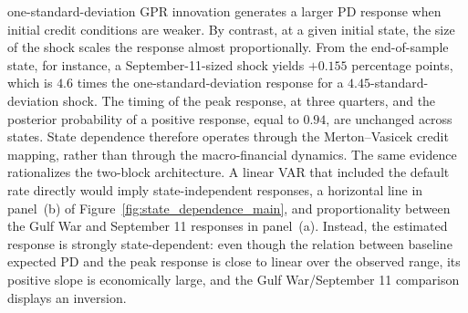 one-standard-deviation GPR innovation generates a larger PD response when
initial credit conditions are weaker. By contrast, at a given initial state,
the size of the shock scales the response almost proportionally. From the
end-of-sample state, for instance, a September-11-sized shock yields
$+0.155$ percentage points, which is $4.6$ times the one-standard-deviation
response for a $4.45$-standard-deviation shock. The timing of the peak
response, at three quarters, and the posterior probability of a positive
response, equal to $0.94$, are unchanged across states. State dependence
therefore operates through the Merton--Vasicek credit mapping, rather than
through the macro-financial dynamics.
The same evidence rationalizes the two-block architecture. A linear VAR that
included the default rate directly would imply state-independent responses, a
horizontal line in panel~(b) of Figure~\ref{fig:state_dependence_main}, and
proportionality between the Gulf War and September 11 responses in
panel~(a). Instead, the estimated response is strongly state-dependent: even
though the relation between baseline expected PD and the peak response is close
to linear over the observed range, its positive slope is economically large,
and the Gulf War/September 11 comparison displays an inversion.
